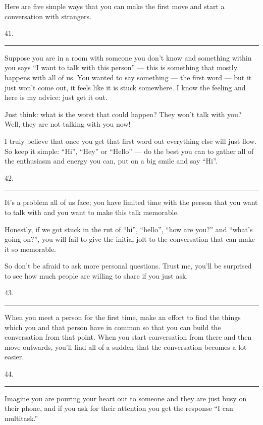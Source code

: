 \documentclass[UTF8,11pt]{ctexart}
\begin{document}
Here are five simple ways that you can make the first move and start a conversation with strangers.


41. \par\noindent\rule{.95\linewidth}{.4pt}\par


Suppose you are in a room with someone you don’t know and something within you says “I want to talk with this person” — this is something that mostly happens with all of us. You wanted to say something — the first word — but it just won’t come out, it feels like it is stuck somewhere. I know the feeling and here is my advice: just get it out.


Just think: what is the worst that could happen? They won’t talk with you? Well, they are not talking with you now!


I truly believe that once you get that first word out everything else will just flow. So keep it simple: “Hi”, “Hey” or “Hello” — do the best you can to gather all of the enthusiasm and energy you can, put on a big smile and say “Hi”.


42. \par\noindent\rule{.95\linewidth}{.4pt}\par


It’s a problem all of us face; you have limited time with the person that you want to talk with and you want to make this talk memorable.


Honestly, if we got stuck in the rut of “hi”, “hello”, “how are you?” and “what’s going on?”, you will fail to give the initial jolt to the conversation that can make it so memorable.


So don’t be afraid to ask more personal questions. Trust me, you’ll be surprised to see how much people are willing to share if you just ask.


43. \par\noindent\rule{.95\linewidth}{.4pt}\par


When you meet a person for the first time, make an effort to find the things which you and that person have in common so that you can build the conversation from that point. When you start conversation from there and then move outwards, you’ll find all of a sudden that the conversation becomes a lot easier.


44. \par\noindent\rule{.95\linewidth}{.4pt}\par


Imagine you are pouring your heart out to someone and they are just busy on their phone, and if you ask for their attention you get the response “I can multitask.”
\end{document}
